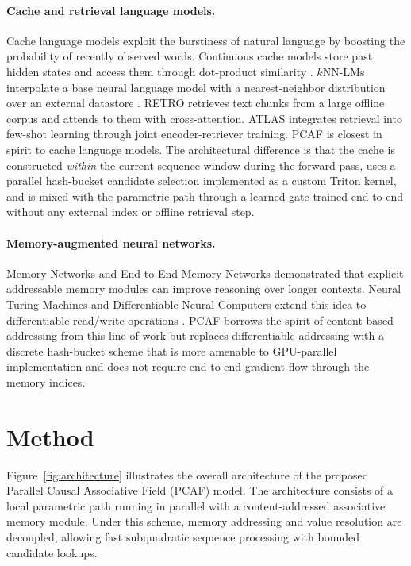 \documentclass[11pt]{article}
\begin{document}
\paragraph{Cache and retrieval language models.}
Cache language models exploit the burstiness of natural language by boosting
the probability of recently observed words. Continuous cache models store past
hidden states and access them through dot-product similarity
\citep{grave2016continuous}. $k$NN-LMs interpolate a base neural language model
with a nearest-neighbor distribution over an external datastore
\citep{khandelwal2019knn}. RETRO \citep{borgeaud2022retro} retrieves
text chunks from a large offline corpus and attends to them with
cross-attention. ATLAS \citep{izacard2022atlas} integrates retrieval into
few-shot learning through joint encoder-retriever training. PCAF is closest in
spirit to cache language models. The architectural difference is that the cache
is constructed \emph{within} the current sequence window during the forward
pass, uses a parallel hash-bucket candidate selection implemented as a custom
Triton kernel, and is mixed with the parametric path through a learned gate
trained end-to-end without any external index or offline retrieval step.

\paragraph{Memory-augmented neural networks.}
Memory Networks \citep{weston2015memory} and End-to-End Memory Networks
\citep{sukhbaatar2015end2end} demonstrated that explicit addressable memory
modules can improve reasoning over longer contexts. Neural Turing Machines and
Differentiable Neural Computers extend this idea to differentiable read/write
operations \citep{graves2014neural}. PCAF borrows the spirit of content-based
addressing from this line of work but replaces differentiable addressing with a
discrete hash-bucket scheme that is more amenable to GPU-parallel
implementation and does not require end-to-end gradient flow through the memory
indices.

\section{Method}

Figure~\ref{fig:architecture} illustrates the overall architecture of the proposed Parallel Causal Associative Field (PCAF) model. The architecture consists of a local parametric path running in parallel with a content-addressed associative memory module. Under this scheme, memory addressing and value resolution are decoupled, allowing fast subquadratic sequence processing with bounded candidate lookups.
\end{document}
